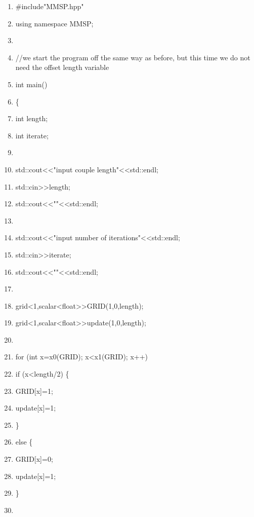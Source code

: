 \documentclass{article}
\begin{document}
\begin{shadebox}
\begin{enumerate} \itemsep1pt \parskip0pt 
\item \#include"MMSP.hpp"
\item using namespace MMSP; 
\item 
\item //we start the program off the same way as before, but this time we do not need the offset length variable
\item int main() 
\item \{ 
\item int length;
\item int iterate;
\item 
\item std::cout\textless \textless "input couple length"\textless \textless std::endl;
\item std::cin\textgreater \textgreater length;
\item std::cout\textless \textless ""\textless \textless std::endl;
\item 
\item std::cout\textless \textless "input number of iterations"\textless \textless std::endl;
\item std::cin\textgreater \textgreater iterate;
\item std::cout\textless \textless ""\textless \textless std::endl;
\item 
\item grid\textless 1,scalar\textless float\textgreater  \textgreater  GRID(1,0,length);
\item grid\textless 1,scalar\textless float\textgreater  \textgreater  update(1,0,length); 
\item 
\item for (int x=x0(GRID); x\textless x1(GRID); x++)
\item \hspace{10pt}         if (x\textless length/2) \{ 
\item \hspace{10pt} \hspace{10pt}                 GRID[x]=1;
\item \hspace{10pt} \hspace{10pt}                 update[x]=1;  
\item \hspace{10pt}         \}           
\item \hspace{10pt}         else \{
\item \hspace{10pt} \hspace{10pt}                 GRID[x]=0;
\item \hspace{10pt} \hspace{10pt}                 update[x]=1;
\item         \}
\item 
\end{enumerate}
\end{shadebox}
\end{document}
